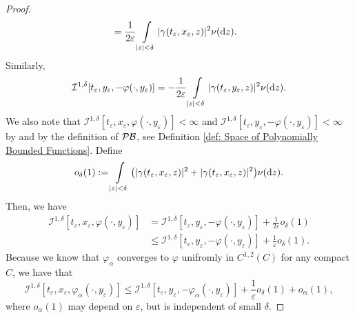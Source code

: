 \begin{proof}
\begin{align*}
        &= \frac{1}{2\varepsilon} \int\limits_{|z|<\delta} |\gamma(t_\varepsilon, x_\varepsilon,z)|^2 \nu(\mathrm{d} z).
    \end{align*}
    Similarly,
    \begin{equation*}
        \mathcal{I}^{1,\delta}[t_\varepsilon, y_\varepsilon, -\varphi(\cdot,y_\varepsilon)] = - \frac{1}{2\varepsilon} \int\limits_{|z|<\delta} |\gamma(t_\varepsilon, y_\varepsilon,z)|^2 \nu(\mathrm{d} z).
    \end{equation*}
    We also note that $\mathcal{I}^{1,\delta}[t_\varepsilon, x_\varepsilon, \varphi(\cdot, y_\varepsilon)]< \infty$ and $\mathcal{I}^{1,\delta}[t_\varepsilon, y_\varepsilon, -\varphi(\cdot,y_\varepsilon)] < \infty$ by  and by the definition of $\mathcal{PB}$, see Definition \ref{def: Space of Polynomially Bounded Functions}. Define 
    \begin{equation*}
        o_\delta(1) := \int\limits_{|z|<\delta} \big( |\gamma(t_\varepsilon,x_\varepsilon,z)|^2 + |\gamma(t_\varepsilon,x_\varepsilon,z)|^2 \big) \nu (\mathrm{d} z).
    \end{equation*}
    Then, we have
    \begin{align*}
        \mathcal{I}^{1,\delta} [t_\varepsilon, x_\varepsilon, \varphi(\cdot, y_\varepsilon)] &= \mathcal{I}^{1,\delta}[t_\varepsilon, y_\varepsilon, -\varphi(\cdot,y_\varepsilon)] + \frac{1}{2\varepsilon} o_\delta(1) \\
        & \leq \mathcal{I}^{1,\delta}[t_\varepsilon, y_\varepsilon, -\varphi(\cdot,y_\varepsilon)] + \frac{1}{\varepsilon} o_\delta(1).
    \end{align*}
    Because we know that $\varphi_\alpha$ converges to $\varphi$ unifromly in $C^{1,2}(C)$ for any compact $C$, we have that
    \begin{equation*}
        \mathcal{I}^{1,\delta} [t_\varepsilon, x_\varepsilon, \varphi_\alpha(\cdot, y_\varepsilon)] \leq \mathcal{I}^{1,\delta}[t_\varepsilon, y_\varepsilon, -\varphi_\alpha(\cdot,y_\varepsilon)] + \frac{1}{\varepsilon} o_\delta(1) + o_\alpha(1),
    \end{equation*}
    where $o_\alpha(1)$ may depend on $\varepsilon$, but is independent of small $\delta$. 


\end{proof}
